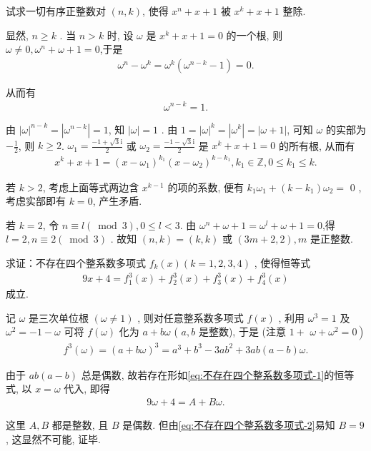 \begin{example}
	试求一切有序正整数对 $(n, k)$, 使得 $x^n+x+1$ 被 $x^k+x+1$ 整除.
\end{example}
\begin{solution}
	显然,  $n \geqslant k$ .
	当 $n>k$ 时, 设 $\omega$ 是 $x^k+x+1=0$ 的一个根, 则 $\omega \neq 0, \omega^n+\omega+1=0$,于是
	\begin{align*}
		\omega^n-\omega^k=\omega^k\left(\omega^{n-k}-1\right)=0 .
	\end{align*}

	从而有
	\begin{align*}
		\omega^{n-k}=1 .
	\end{align*}

	由 $|\omega|^{n-k}=\left|\omega^{n-k}\right|=1$, 知 $|\omega|=1$ .
	由 $1=|\omega|^k=\left|\omega^k\right|=|\omega+1|$, 可知 $\omega$ 的实部为 $-\frac{1}{2}$, 则 $k \geqslant 2$.
	$\omega_1=\frac{-1+\sqrt{3} \mathrm{i}}{2}$ 或 $\omega_2=\frac{-1-\sqrt{3} \mathrm{i}}{2}$ 是 $x^k+x+1=0$ 的所有根, 从而有
	\begin{align*}
		x^k+x+1=\left(x-\omega_1\right)^{k_1}\left(x-\omega_2\right)^{k-k_1}, k_1 \in \mathbb{Z}, 0 \leqslant k_1 \leqslant k .
	\end{align*}

	若 $k>2$, 考虑上面等式两边含 $x^{k-1}$ 的项的系数, 便有 $k_1 \omega_1+\left(k-k_1\right) \omega_2=$ 0 , 考虑实部即有 $k=0$, 产生矛盾.

	若 $k=2$, 令 $n \equiv l(\bmod 3), 0 \leqslant l<3$. 由 $\omega^n+\omega+1=\omega^l+\omega+1=0$,得 $l=2, n \equiv 2(\bmod 3)$ .
	故知 $(n, k)=(k, k)$ 或 $(3 m+2,2), m$ 是正整数.
\end{solution}

\begin{example}
	求证：不存在四个整系数多项式 $f_k(x)(k=1,2,3,4)$ , 使得恒等式
	\begin{align}\label{eq:不存在四个整系数多项式-1}
		9 x+4=f_1^3(x)+f_2^3(x)+f_3^3(x)+f_4^3(x)
	\end{align}
	成立.
\end{example}
\begin{solution}
	记 $\omega$ 是三次单位根 $(\omega \neq 1)$ , 则对任意整系数多项式 $f(x)$ , 利用 $\omega^3=1$ 及 $\omega^2=-1-\omega$ 可将 $f(\omega)$ 化为 $a+b \omega$ ( $a ,  b$ 是整数), 于是 (注意 $1+$ $\left.\omega+\omega^2=0\right)$
	\begin{align*}
		f^3(\omega)=(a+b \omega)^3=a^3+b^3-3 a b^2+3 a b(a-b) \omega .
	\end{align*}

	由于 $a b(a-b)$ 总是偶数, 故若存在形如\autoref{eq:不存在四个整系数多项式-1}的恒等式, 以 $x=\omega$ 代入, 即得
	\begin{align}\label{eq:不存在四个整系数多项式-2}
		9 \omega+4=A+B \omega .
	\end{align}

	这里 $A ,  B$ 都是整数, 且 $B$ 是偶数. 但由\autoref{eq:不存在四个整系数多项式-2}易知 $B=9$, 这显然不可能, 证毕.
\end{solution}

